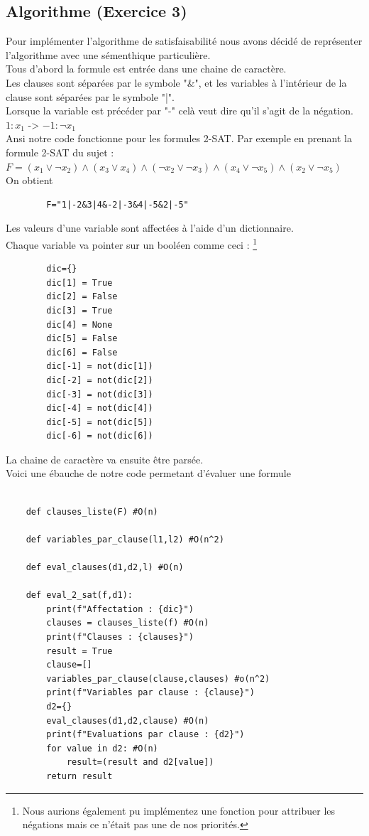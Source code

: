 \documentclass{article}
\begin{document}
    \subsection{Algorithme (Exercice 3)}
    Pour implémenter l'algorithme de satisfaisabilité nous avons décidé de représenter l'algorithme avec une sémenthique particulière. \\
    Tous d'abord la formule est entrée dans une chaine de caractère. \\
    Les clauses sont séparées par le symbole "\&", et les variables à l'intérieur de la clause sont séparées par le symbole "|". \\
    Lorsque la variable est précéder par "-" celà veut dire qu'il s'agit de la négation. \\
    $1 : x_1$ -> $-1 : \neg{x_1}$ \\
    Ansi notre code fonctionne pour les formules 2-SAT.
     Par exemple en prenant la formule 2-SAT du sujet : \\ $F=(x_1 \lor \neg x_2) \wedge (x_3 \lor x_4) \wedge (\neg x_2 \lor \neg x_3) \wedge (x_4 \lor \neg x_5) \wedge (x_2 \lor \neg x_5)$
     \\On obtient \begin{lstlisting}
        F="1|-2&3|4&-2|-3&4|-5&2|-5"
     \end{lstlisting}
     Les valeurs d'une variable sont affectées à l'aide d'un dictionnaire. \\
     Chaque variable va pointer sur un booléen comme ceci : 
     \footnote{Nous aurions également pu implémentez une fonction pour attribuer les négations mais ce n'était pas une de nos priorités.}
     \begin{lstlisting}
        dic={}
        dic[1] = True
        dic[2] = False
        dic[3] = True
        dic[4] = None
        dic[5] = False
        dic[6] = False
        dic[-1] = not(dic[1])
        dic[-2] = not(dic[2])
        dic[-3] = not(dic[3])
        dic[-4] = not(dic[4])
        dic[-5] = not(dic[5])
        dic[-6] = not(dic[6])
     \end{lstlisting} 
    La chaine de caractère va ensuite être parsée. \\
    Voici une ébauche de notre code permetant d'évaluer une formule 
    \begin{lstlisting}

    def clauses_liste(F) #O(n)

    def variables_par_clause(l1,l2) #O(n^2)

    def eval_clauses(d1,d2,l) #O(n)

    def eval_2_sat(f,d1):
        print(f"Affectation : {dic}")
        clauses = clauses_liste(f) #O(n)
        print(f"Clauses : {clauses}")
        result = True
        clause=[]
        variables_par_clause(clause,clauses) #o(n^2)
        print(f"Variables par clause : {clause}")
        d2={}
        eval_clauses(d1,d2,clause) #O(n)
        print(f"Evaluations par clause : {d2}")
        for value in d2: #O(n)
            result=(result and d2[value])
        return result

    \end{lstlisting}
\end{document}
